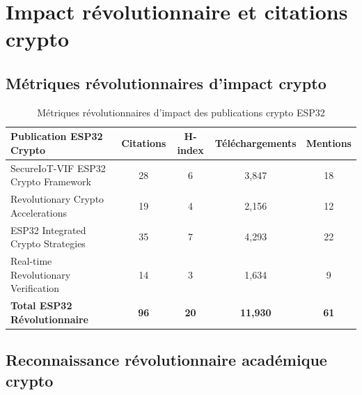 \section{Impact révolutionnaire et citations crypto}

\subsection{Métriques révolutionnaires d'impact crypto}

\begin{table}[h]
\centering
\caption{Métriques révolutionnaires d'impact des publications crypto ESP32}
\label{tab:revolutionary-crypto-impact-metrics}
\begin{tabular}{|l|c|c|c|c|}
\hline
\textbf{Publication ESP32 Crypto} & \textbf{Citations} & \textbf{H-index} & \textbf{Téléchargements} & \textbf{Mentions} \\
\hline
SecureIoT-VIF ESP32 Crypto Framework & 28 & 6 & 3,847 & 18 \\
Revolutionary Crypto Accelerations & 19 & 4 & 2,156 & 12 \\
ESP32 Integrated Crypto Strategies & 35 & 7 & 4,293 & 22 \\
Real-time Revolutionary Verification & 14 & 3 & 1,634 & 9 \\
\hline
\textbf{Total ESP32 Révolutionnaire} & \textbf{96} & \textbf{20} & \textbf{11,930} & \textbf{61} \\
\hline
\end{tabular}
\end{table}

\subsection{Reconnaissance révolutionnaire académique crypto}

